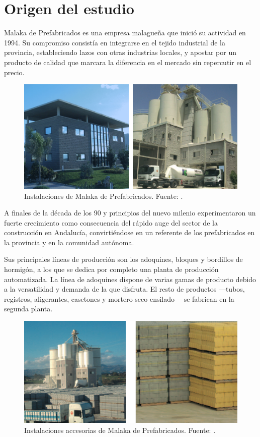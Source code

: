 \section{Origen del estudio}
Malaka de Prefabricados es una empresa malagueña que inició su actividad en 1994. Su compromiso consistía en integrarse en el tejido industrial de la provincia, estableciendo lazos con otras industrias locales, y apostar por un producto de calidad que marcara la diferencia en el mercado sin repercutir en el precio.

\begin{figure}[!htb]
\centering
\includegraphics[width=15cm]{malaka1.png}
\caption[Instalaciones de Malaka de Prefabricados.]{Instalaciones de Malaka de Prefabricados. Fuente: \protect\cite{malakacatalogo}.}
\label{fig:malakainstalaciones1}
\end{figure}

A finales de la década de los 90 y principios del nuevo milenio experimentaron un fuerte crecimiento como consecuencia del rápido auge del sector de la construcción en Andalucía, convirtiéndose en un referente de los prefabricados en la provincia y en la comunidad autónoma.

Sus principales líneas de producción son los adoquines, bloques y bordillos de hormigón, a los que se dedica por completo una planta de producción automatizada. La línea de adoquines dispone de varias gamas de producto debido a la versatilidad y demanda de la que disfruta. El resto de productos —tubos, registros, aligerantes, casetones y mortero seco ensilado— se fabrican en la segunda planta.

\begin{figure}[!htb]
\centering
\includegraphics[width=15cm]{malaka2.png}
\caption[Instalaciones accesorias de Malaka de Prefabricados.]{Instalaciones accesorias de Malaka de Prefabricados. Fuente: \protect\cite{malakacatalogo}.}
\label{fig:malakainstalaciones2}
\end{figure}

